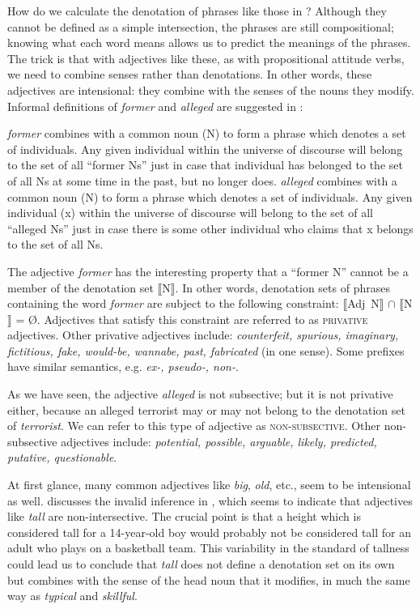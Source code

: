 How do we calculate the denotation of phrases like those in ? Although they cannot be defined as a simple intersection, the phrases are still compositional; knowing what each word means allows us to predict the meanings of the phrases. The trick is that with adjectives like these, as with propositional attitude verbs, we need to combine senses rather than denotations. In other words, these adjectives are intensional: they combine with the senses of the nouns they modify. Informal definitions of \textit{former} and \textit{alleged} are suggested in :


\ea \label{ex:15.11}
\ea   \textit{former} combines with a common noun (N) to form a phrase which denotes a set of individuals. Any given individual within the universe of discourse will belong to the set of all “former Ns” just in case that individual has belonged to the set of all Ns at some time in the past, but no longer does.
\ex  \textit{alleged} combines with a common noun (N) to form a phrase which denotes a set of individuals. Any given individual (x) within the universe of discourse will belong to the set of all “alleged Ns” just in case there is some other individual who claims that x belongs to the set of all Ns.
\z \z


The adjective \textit{former} has the interesting property that a “former N” cannot be a member of the denotation set $\llbracket$N$\rrbracket$. In other words, denotation sets of phrases containing the word \textit{former} are subject to the following constraint: $\llbracket$Adj~N$\rrbracket$  ${\cap}$ $\llbracket$N$\rrbracket$  = \O. Adjectives that satisfy this constraint are referred to as \textsc{privative} adjectives. Other privative adjectives include: \textit{counterfeit, spurious, imaginary, fictitious, fake, would-be, wannabe, past, fabricated} (in one sense). Some prefixes have similar semantics, e.g. \textit{ex-, pseudo-, non-}.



As we have seen, the adjective \textit{alleged} is not subsective; but it is not privative either, because an alleged terrorist may or may not belong to the denotation set of \textit{terrorist}. We can refer to this type of adjective as \textsc{non-subsective}. Other non-subsective adjectives include: \textit{potential, possible, arguable, likely, predicted, putative, questionable}.



At first glance, many common adjectives like \textit{big}, \textit{old}, etc., seem to be intensional as well. \citet{Partee1995} discusses the invalid inference in , which seems to indicate that adjectives like \textit{tall} are non-intersective. The crucial point is that a height which is considered tall for a 14-year-old boy would probably not be considered tall for an adult who plays on a basketball team. This variability in the standard of tallness could lead us to conclude that \textit{tall} does not define a denotation set on its own but combines with the sense of the head noun that it modifies, in much the same way as \textit{typical} and \textit{skillful}.


